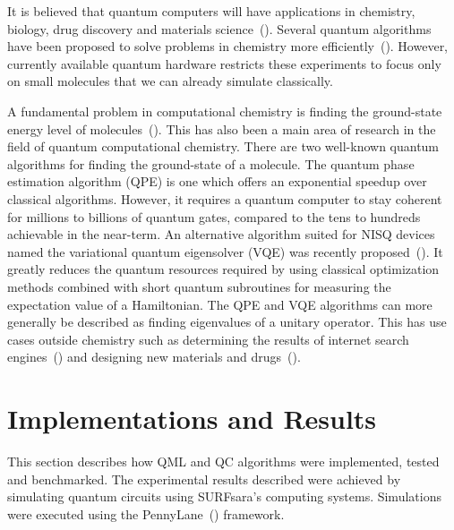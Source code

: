 \documentclass[a4paper,10pt]{article}
\begin{document}
It is believed that quantum computers will have applications in chemistry, biology, drug discovery and materials science~(\cite{mcardle2018quantum}).
Several quantum algorithms have been proposed to solve problems in chemistry more efficiently~(\cite{lidar1999calculating, kassal2008polynomial, aspuru2005simulated, vqe}).
However, currently available quantum hardware restricts these experiments to focus only on small molecules that we can already simulate classically.

A fundamental problem in computational chemistry is finding the ground-state energy level of molecules~(\cite{aspuru2005simulated}).
This has also been a main area of research in the field of quantum computational chemistry.
There are two well-known quantum algorithms for finding the ground-state of a molecule.
The quantum phase estimation algorithm (QPE) is one which offers an exponential speedup over classical algorithms.
However, it requires a quantum computer to stay coherent for millions to billions of quantum gates, compared to the tens to hundreds achievable in the near-term.
An alternative algorithm suited for NISQ devices named the variational quantum eigensolver (VQE) was recently proposed~(\cite{vqe}).
It greatly reduces the quantum resources required by using classical optimization methods combined with short quantum subroutines for measuring the expectation value of a Hamiltonian.
The QPE and VQE algorithms can more generally be described as finding eigenvalues of a unitary operator.
This has use cases outside chemistry such as determining the results of internet search engines~(\cite{page1999pagerank}) and designing new materials and drugs~(\cite{golub2000eigenvalue}).

\section{Implementations and Results} \label{sec:implementation-and-results}
This section describes how QML and QC algorithms were implemented, tested and benchmarked.
The experimental results described were achieved by simulating quantum circuits using SURFsara's computing systems.
Simulations were executed using the PennyLane~(\cite{bergholm2018pennylane}) framework.
\end{document}
